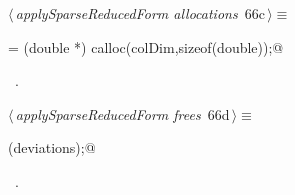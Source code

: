 \documentclass{article}
\begin{document}
\begin{flushleft} \small
\begin{minipage}{\linewidth}\label{scrap101}\raggedright\small
{} $\langle\,${\itshape applySparseReducedForm allocations}\nobreak\ {\footnotesize {66c}}$\,\rangle\equiv$
\vspace{-1ex}
\begin{list}{}{} \item
\mbox{}\verb@deviations = (double *) calloc(colDim,sizeof(double));@\\
\mbox{}\verb@@{\NWsep}
\end{list}
\vspace{-1.5ex}
\footnotesize
\begin{list}{}{\setlength{\itemsep}{-\parsep}\setlength{\itemindent}{-\leftmargin}}
\item \NWtxtMacroRefIn\ .

\item{}
\end{list}
\end{minipage}\vspace{4ex}
\end{flushleft}
\begin{flushleft} \small
\begin{minipage}{\linewidth}\label{scrap102}\raggedright\small
{} $\langle\,${\itshape applySparseReducedForm frees}\nobreak\ {\footnotesize {66d}}$\,\rangle\equiv$
\vspace{-1ex}
\begin{list}{}{} \item
\mbox{}\verb@free(deviations);@{\NWsep}
\end{list}
\vspace{-1.5ex}
\footnotesize
\begin{list}{}{\setlength{\itemsep}{-\parsep}\setlength{\itemindent}{-\leftmargin}}
\item \NWtxtMacroRefIn\ .

\item{}
\end{list}
\end{minipage}\vspace{4ex}
\end{flushleft}
\end{document}
